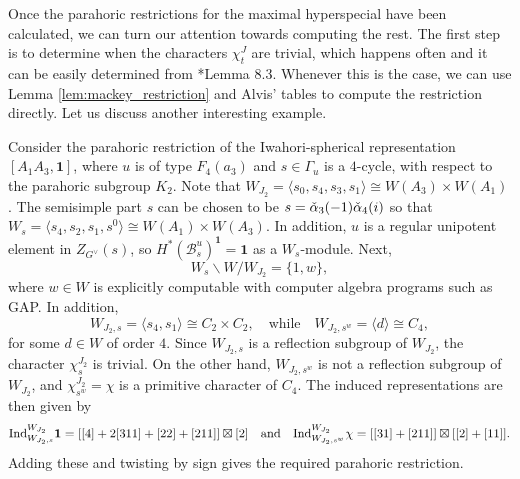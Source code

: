 Once the parahoric restrictions for the maximal hyperspecial have been calculated, we can turn our attention towards computing the rest. The first step is to determine when the characters $\chi_t^J$ are trivial, which happens often and it can be easily determined from \cite{Reeder2000}*{Lemma 8.3}. Whenever this is the case, we can use Lemma \ref{lem:mackey_restriction} and Alvis' tables to compute the restriction directly. Let us discuss another interesting example.

\begin{example}
    Consider the parahoric restriction of the Iwahori-spherical representation $[A_1A_3,\mathbf{1}]$, where $u$ is of type $F_4(a_3)$ and $s\in\Gamma_u$ is a $4$-cycle, with respect to the parahoric subgroup $K_2$. Note that $W_{J_2}=\langle s_0,s_4,s_3,s_1\rangle\cong W(A_3)\times W(A_1)$. The semisimple part $s$ can be chosen to be $s=\check{\alpha}_3(-1)\check{\alpha}_4(i)$ so that $W_s=\langle s_4,s_2,s_1,s^0\rangle\cong W(A_1)\times W(A_3)$. In addition, $u$ is a regular unipotent element in $Z_{G^\vee}(s)$, so $H^*(\mathcal{B}_s^u)^{\mathbf{1}}=\mathbf{1}$ as a $W_s$-module. Next,
    $$W_s\backslash W/W_{J_2}=\{1,w\},$$
    where $w\in W$ is explicitly computable with computer algebra programs such as GAP. In addition, 
    $$W_{J_2,s}=\langle s_4,s_1\rangle\cong C_2\times C_2,\quad\text{while}\quad W_{J_2,s^w}=\langle d \rangle\cong C_4,$$
    for some $d\in W$ of order $4$. Since $W_{J_2,s}$ is a reflection subgroup of $W_{J_2}$, the character $\chi_s^{J_2}$ is trivial. On the other hand, $W_{J_2,s^w}$ is not a reflection subgroup of $W_{J_2}$, and $\chi_{s^w}^{J_2}=\chi$ is a primitive character of $C_4$. The induced representations are then given by
    \begin{align*}
        \mathrm{Ind}_{W_{J_2,s}}^{W_{J_2}}\mathbf{1}=[[4]+2[311]+[22]+[211]]\boxtimes[2]\quad\text{and}\quad\mathrm{Ind}_{W_{J_2,s^w}}^{W_{J_2}}\chi=[[31]+[211]]\boxtimes[[2]+[11]].
    \end{align*}    
    Adding these and twisting by sign gives the required parahoric restriction.
\end{example}



